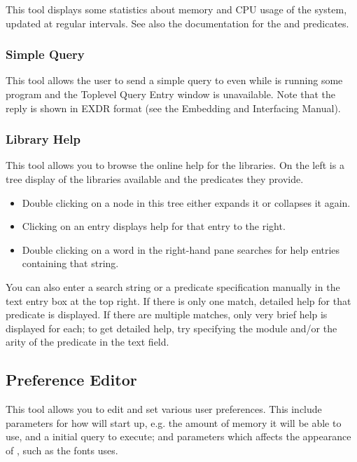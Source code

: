 This tool displays some statistics about memory and CPU usage of the
{\eclipse} system, updated at regular intervals.
See also the documentation for the
 and
 predicates.

\subsubsection{Simple Query}

This tool allows the user to send a simple query to {\eclipse} even while
{\eclipse} is running some program and the Toplevel Query Entry window
is unavailable.
Note that the reply is shown in EXDR format (see the {\eclipse} Embedding
and Interfacing Manual).

\subsubsection{Library Help}

This tool allows you to browse the online help for the {\eclipse} libraries.
On the left is a tree display of the libraries available and the predicates
they provide.
\begin{itemize}
\item Double clicking on a node in this tree either expands it or collapses it
again.
\item Clicking on an entry displays help for that entry to the right.
\item Double clicking on a word in the right-hand pane searches for help
entries containing that string.
\end{itemize}
You can also enter a search string or a predicate specification manually
in the text entry box at the top right.
If there is only one match, detailed help for that predicate is displayed.
If there are multiple matches, only very brief help is displayed for each;
to get detailed help, try specifying the module and/or the arity of the
predicate in the text field.

\subsection{Preference Editor}

This tool allows you to edit and set various user preferences. This include
parameters for how {\tkeclipse} will start up, e.g. the amount of memory it
will be able to use, and a initial query to execute; and parameters which
affects the appearance of {\tkeclipse}, such as the fonts {\tkeclipse}
uses.

